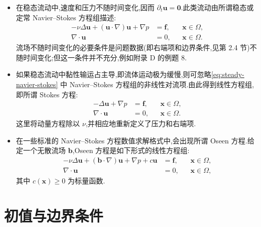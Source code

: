 \begin{note}[不可压缩流动模型的特殊情形]\label{note:special-incompressible-models}
\begin{itemize}
  \item 在稳态流动中,速度和压力不随时间变化,因而 $\partial_t\bm{u}=\bm{0}$.此类流动由所谓稳态或定常 Navier--Stokes 方程组描述:
  \begin{equation}\label{eq:steady-navier-stokes}
  \begin{aligned}
    -\nu\Delta\bm{u}+(\bm{u}\cdot\nabla)\bm{u}
      +\nabla p&=\bm{f},&&\bm{x}\in\Omega,\\
    \nabla\cdot\bm{u}&=0,&&\bm{x}\in\Omega.
  \end{aligned}
  \end{equation}
  流场不随时间变化的必要条件是问题数据(即右端项和边界条件,见第 2.4 节)不随时间变化;但这一条件并不充分,例如附录 D 的例题 8.
  \item 如果稳态流动中黏性输运占主导,即流体运动极为缓慢,则可忽略\cref{eq:steady-navier-stokes} 中 Navier--Stokes 方程组的非线性对流项.由此得到线性方程组,即所谓 Stokes 方程:
  \begin{equation}\label{eq:stokes-equations}
  \begin{aligned}
    -\Delta\bm{u}+\nabla p&=\bm{f},&&\bm{x}\in\Omega,\\
    \nabla\cdot\bm{u}&=0,&&\bm{x}\in\Omega.
  \end{aligned}
  \end{equation}
  这里将动量方程除以 $\nu$,并相应地重新定义了压力和右端项.
  \item 在一些标准的 Navier--Stokes 方程数值求解格式中,会出现所谓 Oseen 方程.给定一个无散流场 $\bm{b}$,Oseen 方程是如下形式的线性方程组:
  \begin{equation}\label{eq:oseen-equations}
  \begin{aligned}
    -\nu\Delta\bm{u}+(\bm{b}\cdot\nabla)\bm{u}
      +\nabla p+c\bm{u}&=\bm{f},&&\bm{x}\in\Omega,\\
    \nabla\cdot\bm{u}&=0,&&\bm{x}\in\Omega,
  \end{aligned}
  \end{equation}
  其中 $c(\bm{x})\geq0$ 为标量函数.
\end{itemize}
\end{note}

\section{初值与边界条件}\label{sec:initial-boundary}
\markright{\thesection}


